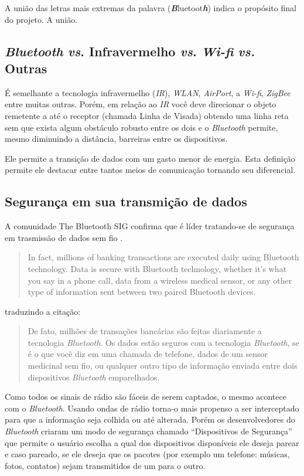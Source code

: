 \documentclass[portugues, brazil, a4paper,12pt]{article}
\begin{document}
A união das letras mais extremas da palavra (\textbf{\textit{B}}luetoot\textbf{\textit{h}}) indica o propósito final do projeto. A união.

\subsection{\textit{Bluetooth} \textit{vs}. Infravermelho \textit{vs}. \textit{Wi-fi} \textit{vs.} Outras}
É semelhante a tecnologia infravermelho (\textit{IR}), \textit{WLAN}, \textit{AirPort}, a \textit{Wi-fi}, \textit{ZigBee} entre muitas outras. Porém, em relação ao \textit{IR} você deve direcionar o objeto remetente a até o receptor (chamada Linha de Visada) obtendo uma linha reta sem que exista algum obstáculo robusto entre os dois e o \textit{Bluetooth} permite, mesmo diminuindo a distância, barreiras entre os dispositivos. 

Ele permite a transição de dados com um gasto menor de energia. Esta definição permite ele destacar entre tantos meios de comunicação tornando seu diferencial.

\subsection{Segurança em sua transmição de dados}
A comunidade The Bluetooth SIG confirma que é líder tratando-se de segurança em trasmissão de dados sem fio \cite{seguranca}.

\begin{quote}
	In fact, millions of banking transactions are executed daily using Bluetooth technology. Data is secure with Bluetooth technology, whether it's what you say in a phone call, data from a wireless medical sensor, or any other type of information sent between two paired Bluetooth devices.
\end{quote}

traduzindo a citação:

\begin{quote}
	De fato, milhões de transações bancárias são feitas diariamente a tecnologia \textit{Bluetooth}. Os dados estão seguros com a tecnologia \textit{Bluetooth}, se é o que você diz em uma chamada de telefone, dados de um sensor medicinal sem fio, ou qualquer outro tipo de informação enviada entre dois dispositivos \textit{Bluetooth} emparelhados.
\end{quote}

Como todos os sinais de rádio são fáceis de serem captados, o mesmo acontece com o \textit{Bluetooth}. Usando ondas de rádio torna-o mais propenso a ser interceptado para que a informação seja colhida ou até alterada. Porém os desenvolvedores do \textit{Bluetooth} criaram um modo de segurança chamado “Dispositivos de Segurança” que permite o usuário escolha a qual dos dispositivos disponíveis ele deseja parear e caso pareado, se ele deseja que os pacotes (por exemplo um telefone: músicas, fotos, contatos) sejam transmitidos de um para o outro.
\end{document}
